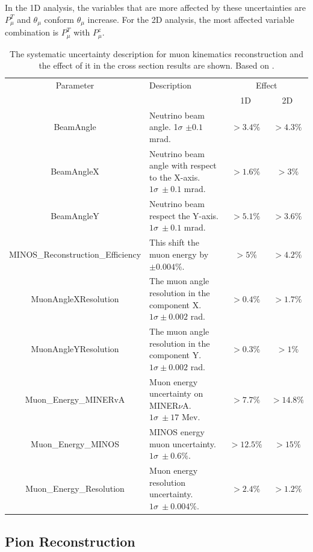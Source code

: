 In the 1D analysis, the variables that are more affected by these uncertainties are $P^T_\mu$ and $\theta_\mu$ conform $\theta_\mu$ increase. For the 2D analysis, the most affected variable combination is $P^T_\mu$ with $P^z_\mu$.  
\begin{table}[!htb]
    \centering
    \begin{tabular}{c|p{2in}|c|c}
        \hline 
        Parameter & Description  & \multicolumn{2}{c}{Effect} \\
         & & 1D & 2D \\
        \hline  
        BeamAngle & Neutrino beam angle. 1$\sigma$ $\pm0.1$ mrad. & $>3.4\%$ & $>4.3\%$\\ \hline
        BeamAngleX & Neutrino beam angle with respect to the X-axis. $1\sigma\ \pm0.1$ mrad. & $>1.6\%$ & $>3\%$ \\ \hline
        BeamAngleY & Neutrino beam respect the Y-axis. $1\sigma\ \pm0.1$ mrad. & $>5.1\%$ & $>3.6\%$ \\ \hline
        MINOS\_Reconstruction\_Efficiency & This shift the muon energy by $\pm0.004\%$. & $>5\%$ & $>4.2\%$\\ \hline
        MuonAngleXResolution & The muon angle resolution in the component X. $1\sigma \pm0.002$ rad.  & $>0.4\%$ & $>1.7\%$ \\ \hline
        MuonAngleYResolution & The muon angle resolution in the component Y. $1\sigma \pm0.002$ rad. & $>0.3\%$ & $>1\%$ \\ \hline
        Muon\_Energy\_MINERvA & Muon energy uncertainty on MINER$\nu$A. $1\sigma\ \pm17$ Mev. & $>7.7\%$ & $>14.8\%$\\ \hline
        Muon\_Energy\_MINOS & MINOS energy muon uncertainty. $1\sigma\ \pm0.6\%$.  & $>12.5\%$ & $>15\%$ \\ \hline
        Muon\_Energy\_Resolution & Muon energy resolution uncertainty. $1\sigma\ \pm0.004\%$. & $>2.4\%$ & $>1.2\%$ \\ \hline
    \end{tabular}
    \caption{The systematic uncertainty description for muon kinematics reconstruction and the effect of it in the cross section results are shown. Based on \cite{AmitBashyal:2021tzd}.}
    \label{tab:ErrorAnalysis:SystematicUnc:Muon}
\end{table}



\pagebreak
\subsection{Pion Reconstruction}
\label{Cap:ErrorAnalysis:SystematicUnc:PionReco}

